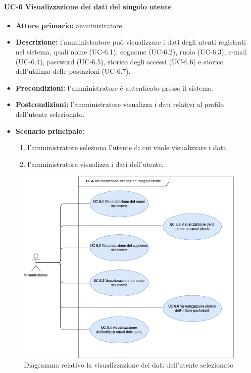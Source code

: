 \paragraph{UC-6 Visualizzazione dei dati del singolo utente}
\begin{itemize}
	\item \textbf{Attore primario:} amministratore.

	\item \textbf{Descrizione:} l'amministratore può visualizzare i dati degli utenti registrati nel sistema, quali nome (UC-6.1), cognome (UC-6.2), ruolo (UC-6.3), e-mail (UC-6.4), password (UC-6.5), storico degli accessi (UC-6.6) e storico dell'utilizzo delle postazioni (UC-6.7).
	
	\item \textbf{Precondizioni:} l'amministratore è autenticato presso il sistema.

	\item \textbf{Postcondizioni:} l'amministratore visualizza i dati relativi al profilo dell'utente selezionato.

	\item \textbf{Scenario principale:}
	\begin{enumerate}
    	\item  l'amministratore seleziona l'utente di cui vuole visualizzare i dati;
    	\item  l'amministratore visualizza i dati dell'utente.
	\end{enumerate}
\end{itemize}

\begin{figure}[H]
    \centering
      \includegraphics[scale=0.45]{src/CasiDUso/immagini/DatiUtente.png}
    \caption{Diagramma relativo la visualizzazione dei dati dell'utente selezionato}
\end{figure}

